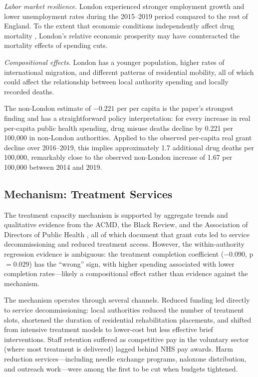 \documentclass[12pt]{article}
\begin{document}
\textit{Labor market resilience.} London experienced stronger employment growth and lower unemployment rates during the 2015--2019 period compared to the rest of England. To the extent that economic conditions independently affect drug mortality \citep{hollingsworth2017, venkataramani2020}, London's relative economic prosperity may have counteracted the mortality effects of spending cuts.

\textit{Compositional effects.} London has a younger population, higher rates of international migration, and different patterns of residential mobility, all of which could affect the relationship between local authority spending and locally recorded deaths.

The non-London estimate of $-0.221$ per  per capita is the paper's strongest finding and has a straightforward policy interpretation: for every  increase in real per-capita public health spending, drug misuse deaths decline by 0.221 per 100,000 in non-London authorities. Applied to the observed  per-capita real grant decline over 2016--2019, this implies approximately 1.7 additional drug deaths per 100,000, remarkably close to the observed non-London increase of 1.67 per 100,000 between 2014 and 2019.

\subsection{Mechanism: Treatment Services}

The treatment capacity mechanism is supported by aggregate trends and qualitative evidence from the ACMD, the Black Review, and the Association of Directors of Public Health \citep{acmd2016, black2020, adph2019}, all of which document that grant cuts led to service decommissioning and reduced treatment access. However, the within-authority regression evidence is ambiguous: the treatment completion coefficient ($-0.090$, p $= 0.029$) has the ``wrong'' sign, with higher spending associated with lower completion rates---likely a compositional effect rather than evidence against the mechanism.

The mechanism operates through several channels. Reduced funding led directly to service decommissioning: local authorities reduced the number of treatment slots, shortened the duration of residential rehabilitation placements, and shifted from intensive treatment models to lower-cost but less effective brief interventions. Staff retention suffered as competitive pay in the voluntary sector (where most treatment is delivered) lagged behind NHS pay awards. Harm reduction services---including needle exchange programs, naloxone distribution, and outreach work---were among the first to be cut when budgets tightened.
\end{document}
